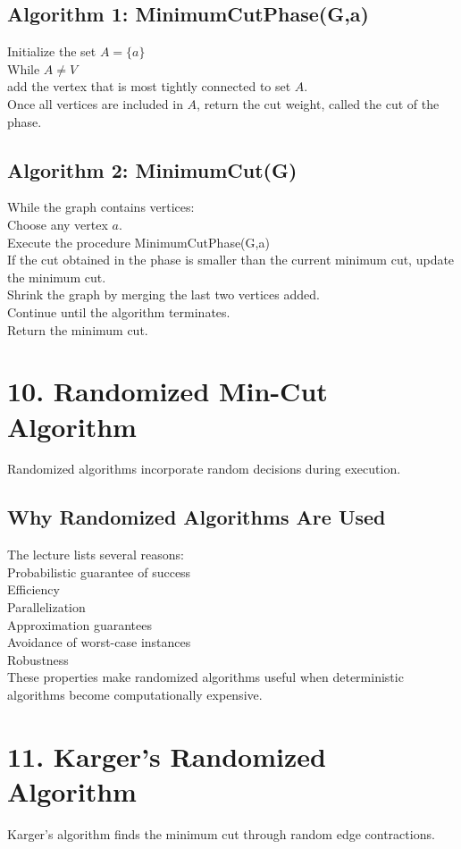 \documentclass{article}
\begin{document}
\subsection{Algorithm 1: MinimumCutPhase(G,a)}
Initialize the set $A = \{a\}$ \\
While $A \neq V$ \\
add the vertex that is most tightly connected to set $A$. \\
Once all vertices are included in $A$, return the cut weight, called the cut of the phase.

\subsection{Algorithm 2: MinimumCut(G)}
While the graph contains vertices: \\
Choose any vertex $a$. \\
Execute the procedure MinimumCutPhase(G,a) \\
If the cut obtained in the phase is smaller than the current minimum cut, update the minimum cut. \\
Shrink the graph by merging the last two vertices added. \\
Continue until the algorithm terminates. \\
Return the minimum cut.

\section{10. Randomized Min-Cut Algorithm}
Randomized algorithms incorporate random decisions during execution.

\subsection{Why Randomized Algorithms Are Used}
The lecture lists several reasons: \\
Probabilistic guarantee of success \\
Efficiency \\
Parallelization \\
Approximation guarantees \\
Avoidance of worst-case instances \\
Robustness \\
These properties make randomized algorithms useful when deterministic algorithms become computationally expensive.

\section{11. Karger's Randomized Algorithm}
Karger's algorithm finds the minimum cut through random edge contractions.
\end{document}
